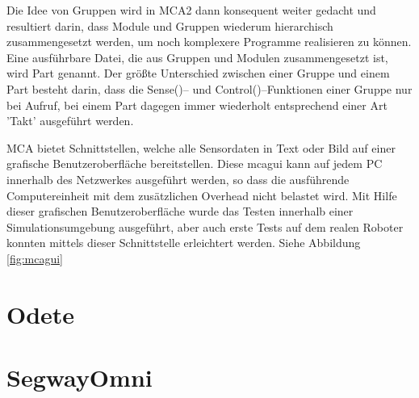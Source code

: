 Die Idee von Gruppen wird in MCA2 dann konsequent weiter gedacht und resultiert darin,
 dass Module und Gruppen wiederum hierarchisch zusammengesetzt werden, um noch komplexere Programme realisieren zu können.
 Eine ausführbare Datei, die aus Gruppen und Modulen zusammengesetzt ist, wird Part genannt.
 Der größte Unterschied zwischen einer Gruppe und einem Part besteht darin, dass die Sense()-- und Control()--Funktionen einer Gruppe nur bei Aufruf,
 bei einem Part dagegen immer wiederholt entsprechend einer Art 'Takt' ausgeführt werden.

MCA bietet Schnittstellen, welche alle Sensordaten in Text oder Bild auf einer grafische Benutzeroberfläche bereitstellen.
 Diese mcagui kann auf jedem PC innerhalb des Netzwerkes ausgeführt werden, so dass die ausführende Computereinheit
 mit dem zusätzlichen Overhead nicht belastet wird. Mit Hilfe dieser grafischen Benutzeroberfläche wurde das Testen
 innerhalb einer Simulationsumgebung ausgeführt, aber auch erste Tests auf dem realen Roboter konnten mittels dieser Schnittstelle erleichtert werden.
 Siehe Abbildung \ref{fig:mcagui} \citep{mca}


\section{Odete}
\authorsection{\editordirk}


\section{SegwayOmni}
\authorsection{\editordirk}


